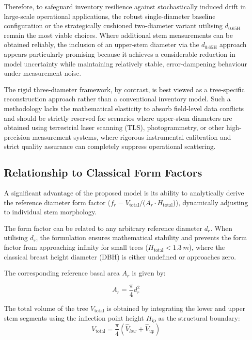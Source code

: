 \documentclass[twocolumn, bibliography=totoc]{scrartcl}
\begin{document}
Therefore, to safeguard inventory resilience against stochastically induced drift in large-scale operational applications, the robust single-diameter baseline configuration or the strategically cushioned two-diameter variant utilising $d_{0.65\text{H}}$ remain the most viable choices. Where additional stem measurements can be obtained reliably, the inclusion of an upper-stem diameter via the $d_{0.65\text{H}}$ approach appears particularly promising because it achieves a considerable reduction in model uncertainty while maintaining relatively stable, error-dampening behaviour under measurement noise. 

The rigid three-diameter framework, by contrast, is best viewed as a tree-specific reconstruction approach rather than a conventional inventory model. Such a methodology lacks the mathematical elasticity to absorb field-level data conflicts and should be strictly reserved for scenarios where upper-stem diameters are obtained using terrestrial laser scanning (TLS), photogrammetry, or other high-precision measurement systems, where rigorous instrumental calibration and strict quality assurance can completely suppress operational scattering.


\subsection{Relationship to Classical Form Factors}

A significant advantage of the proposed model is its ability to analytically derive the reference diameter form factor ($f_{r} = V_{\text{total}} / (A_{r} \cdot H_{\text{total}}$)), dynamically adjusting to individual stem morphology. 

The form factor can be related to any arbitrary reference diameter $d_r$. When utilising $d_r$, the formulation ensures mathematical stability and prevents the form factor from approaching infinity for small trees ($H_{\text{total}} < \qty{1.3}{m}$), where the classical breast height diameter (DBH) is either undefined or approaches zero.

The corresponding reference basal area $A_r$ is given by:

\begin{equation}
A_r = \frac{\pi}{4} d_r^2
\end{equation}

The total volume of the tree $V_{\text{total}}$ is obtained by integrating the lower and upper stem segments using the inflection point height $H_{\text{ip}}$ as the structural boundary:
\begin{equation}
V_{\text{total}} = \frac{\pi}{4} \left( \hat{V}_{low} + \hat{V}_{up} \right)
\end{equation}
\end{document}
